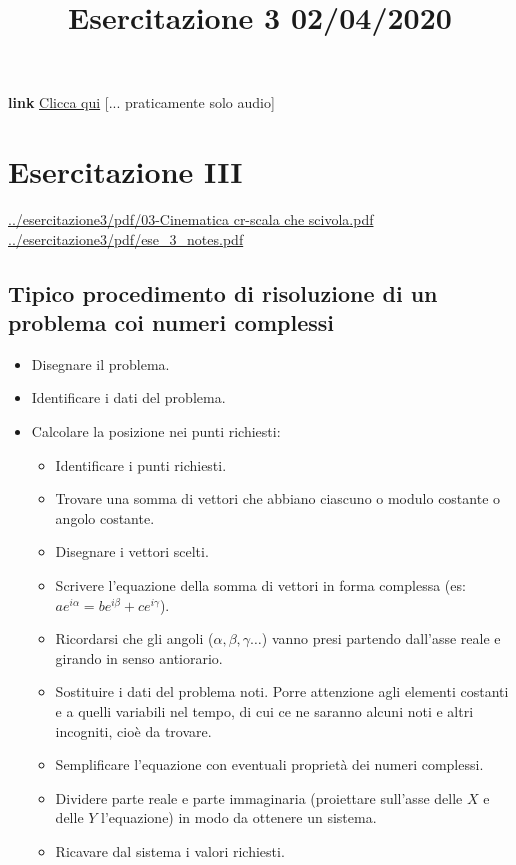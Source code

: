 \title{Esercitazione 3 02/04/2020}\newline
\textbf{link} \href{https://web.microsoftstream.com/video/490e9a91-e0f9-4769-a4ce-f9fc559ed5c1}{Clicca qui} [... praticamente solo audio]
\section{Esercitazione III}
\url{../esercitazione3/pdf/03-Cinematica cr-scala che scivola.pdf}\newline
\url{../esercitazione3/pdf/ese_3_notes.pdf}
\subsection{Tipico procedimento di risoluzione di un problema coi numeri complessi}
\begin{itemize}
    \item Disegnare il problema.
    \item Identificare i dati del problema.
    \item Calcolare la posizione nei punti richiesti:
    \begin{itemize}
        \item Identificare i punti richiesti.
        \item Trovare una somma di vettori che abbiano ciascuno o modulo costante o angolo costante.
        \item Disegnare i vettori scelti.
        \item Scrivere l'equazione della somma di vettori in forma complessa (es: $a e^{i \alpha} = b e^{i \beta} + c e^{i \gamma}$).
        \item Ricordarsi che gli angoli ($\alpha, \beta, \gamma\dots$) vanno presi partendo dall'asse reale e girando in senso antiorario.
        \item Sostituire i dati del problema noti. Porre attenzione agli elementi costanti e a quelli variabili nel tempo, di cui ce ne saranno alcuni noti e altri incogniti, cioè da trovare.
        \item Semplificare l'equazione con eventuali proprietà dei numeri complessi.
        \item Dividere parte reale e parte immaginaria (proiettare sull'asse delle $X$ e delle $Y$ l'equazione) in modo da ottenere un sistema.
        \item Ricavare dal sistema i valori richiesti.

\end{itemize}
\end{itemize}

